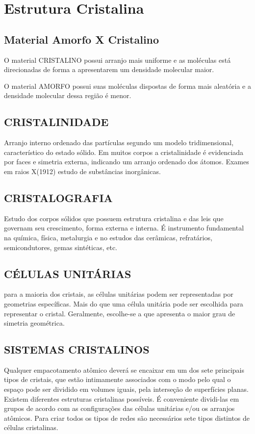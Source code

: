 \section{Estrutura Cristalina}

\subsection*{Material Amorfo X Cristalino}
O material CRISTALINO possui arranjo mais uniforme e as moléculas está direcionadas de forma a apresentarem um densidade molecular maior. 

O material AMORFO possui suas moléculas dispostas de forma mais aleatória e a densidade molecular dessa região é menor.


\subsection*{CRISTALINIDADE} Arranjo interno ordenado das partículas segundo um modelo tridimensional, característico do estado sólido. Em muitos corpos a cristalinidade é evidenciada por faces e simetria externa, indicando um arranjo ordenado dos átomos. Exames em raios X(1912) estudo de substâncias inorgânicas.

\subsection*{CRISTALOGRAFIA} Estudo dos corpos sólidos que possuem estrutura cristalina e das leis que governam seu crescimento, forma externa e interna. É instrumento fundamental na química, física, metalurgia e no estudos das cerâmicas, refratários, semicondutores, gemas sintéticas, etc.


\subsection*{CÉLULAS UNITÁRIAS} para a maioria dos cristais, as células unitárias podem ser representadas por geometrias específicas. Mais do que uma célula unitária pode ser escolhida para representar o cristal. Geralmente, escolhe-se a que apresenta o maior grau de simetria geométrica.



\subsection*{SISTEMAS CRISTALINOS} Qualquer empacotamento atômico deverá se encaixar em um dos sete principais tipos de cristais, que estão intimamente associados com o modo pelo qual o espaço pode ser dividido em volumes iguais, pela interseção de superfícies planas.
Existem diferentes estruturas cristalinas possíveis. É conveniente dividi-las em grupos de acordo com as configurações das células unitárias e/ou os arranjos atômicos. Para criar todos os tipos de redes são necessários sete tipos distintos de células cristalinas.


